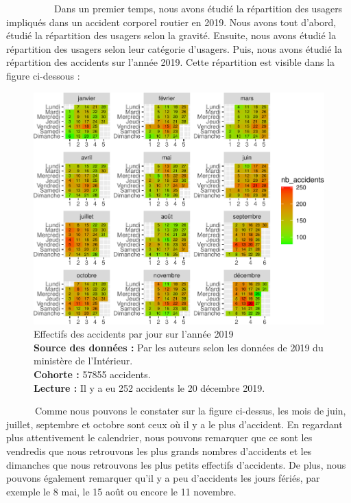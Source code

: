 \documentclass[french,]{tp}
\begin{document}
~~~~~~~~~~Dans un premier temps, nous avons étudié la répartition des usagers impliqués dans un accident corporel routier en 2019. Nous avons tout d'abord, étudié la répartition des usagers selon la gravité. Ensuite, nous avons étudié la répartition des usagers selon leur catégorie d'usagers. Puis, nous avons étudié la répartition des accidents sur l'année 2019. Cette répartition est visible dans la figure ci-dessous :






\begin{figure}[ht!]

{\centering \includegraphics{Prediction_Gravite_files/figure-latex/calendrier-1} 

}

\caption{Effectifs des accidents par jour sur l'année 2019\\
\textbf{Source des données :} Par les auteurs selon les données de 2019 du ministère de l'Intérieur.\\
\textbf{Cohorte :} 57855 accidents.\\
\textbf{Lecture :} Il y a eu 252 accidents le 20 décembre 2019.}\label{fig:calendrier}
\end{figure}

~~~~~~Comme nous pouvons le constater sur la figure ci-dessus, les mois de juin, juillet, septembre et octobre sont ceux où il y a le plus d'accident. En regardant plus attentivement le calendrier, nous pouvons remarquer que ce sont les vendredis que nous retrouvons les plus grands nombres d'accidents et les dimanches que nous retrouvons les plus petits effectifs d'accidents. De plus, nous pouvons également remarquer qu'il y a peu d'accidents les jours fériés, par exemple le 8 mai, le 15 août ou encore le 11 novembre.
\end{document}
